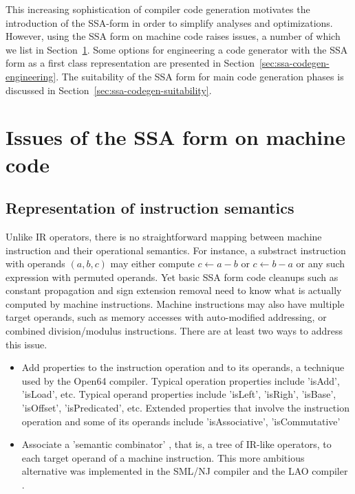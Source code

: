 This increasing sophistication of compiler code generation motivates the
introduction of the SSA-form in order to simplify analyses and optimizations.
However, using the SSA form on machine code raises issues, a number of
which we list in Section~\ref{sec:ssa-codegen-issues}.  Some options for
engineering a code generator with the SSA form as a first class representation
are presented in Section~\ref{sec:ssa-codegen-engineering}.  The suitability of
the SSA form for main code generation phases is discussed in
Section~\ref{sec:ssa-codegen-suitability}.

\section{Issues of the SSA form on machine code}
\label{sec:ssa-codegen-issues}

\subsection{Representation of instruction semantics}

Unlike IR operators, there is no straightforward mapping between machine
instruction and their operational semantics. For instance, a substract
instruction with operands $(a,b,c)$ may either compute $c \leftarrow a-b$ or $c
\leftarrow b-a$ or any such expression with permuted operands. Yet basic SSA
form code cleanups such as constant propagation and sign extension removal need
to know what is actually computed by machine instructions.  Machine instructions
may also have multiple target operands, such as memory accesses with
auto-modified addressing, or combined division/modulus instructions.
There are at least two ways to address this issue. \begin{itemize}
\item Add properties to the instruction operation and to its operands, a
technique used by the Open64 compiler. Typical operation properties include
'isAdd', 'isLoad', etc. Typical operand properties include 'isLeft', 'isRigh',
'isBase', 'isOffset', 'isPredicated', etc. Extended properties that involve the
instruction operation and some of its operands include 'isAssociative',
'isCommutative'
\item Associate a 'semantic combinator' \cite{Leung:1999:PLDI}, that is, a tree
of IR-like operators, to each target operand of a machine instruction. This more
ambitious alternative was implemented in the SML/NJ \cite{Leung:1999:PLDI}
compiler and the LAO compiler \cite{Dinechin:2000:CASES}.  \end{itemize}

